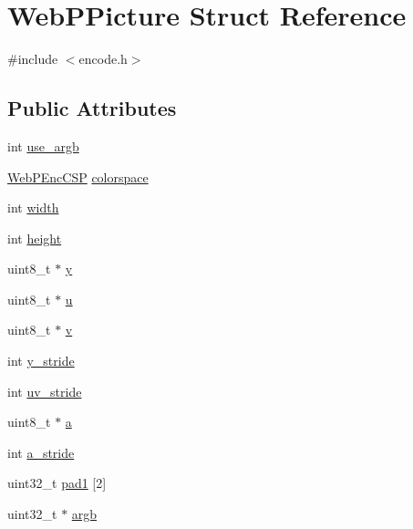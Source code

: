 \hypertarget{struct_web_p_picture}{}\section{Web\+P\+Picture Struct Reference}
\label{struct_web_p_picture}


{\ttfamily \#include $<$encode.\+h$>$}

\subsection*{Public Attributes}
\begin{DoxyCompactItemize}
\item 
int \mbox{\hyperlink{struct_web_p_picture_a80d9adec5005d52025ac7e4407bd464e}{use\+\_\+argb}}
\item 
\mbox{\hyperlink{encode_8h_a40e7d92ce3a63e372e184efbcd62c925}{Web\+P\+Enc\+C\+SP}} \mbox{\hyperlink{struct_web_p_picture_a3da62a6144bda9f8a25c851cc3c5b8c9}{colorspace}}
\item 
int \mbox{\hyperlink{struct_web_p_picture_a100898a4048f95fc6c91558aceaa99df}{width}}
\item 
int \mbox{\hyperlink{struct_web_p_picture_a033bd88269b0bde323e3cc24b24854e0}{height}}
\item 
uint8\+\_\+t $\ast$ \mbox{\hyperlink{struct_web_p_picture_a2a7d500f47757cd483db60ac35d8a041}{y}}
\item 
uint8\+\_\+t $\ast$ \mbox{\hyperlink{struct_web_p_picture_a073da8cb988f1a32d1859d708561d181}{u}}
\item 
uint8\+\_\+t $\ast$ \mbox{\hyperlink{struct_web_p_picture_a7b502a9b9b14185a490a05deefda438a}{v}}
\item 
int \mbox{\hyperlink{struct_web_p_picture_ae8e016b9af5d8155b16005904f6f5881}{y\+\_\+stride}}
\item 
int \mbox{\hyperlink{struct_web_p_picture_a302e79b710cff94b46432066d267db21}{uv\+\_\+stride}}
\item 
uint8\+\_\+t $\ast$ \mbox{\hyperlink{struct_web_p_picture_a9ba92e4968230d840da0acbf48f6f2fb}{a}}
\item 
int \mbox{\hyperlink{struct_web_p_picture_a02c5a78d2e29327439d258a47afd036a}{a\+\_\+stride}}
\item 
uint32\+\_\+t \mbox{\hyperlink{struct_web_p_picture_a4bf90baa1a76c06e7e96f9fdcd42e357}{pad1}} \mbox{[}2\mbox{]}
\item 
uint32\+\_\+t $\ast$ \mbox{\hyperlink{struct_web_p_picture_a69213b56a4eb3894d9b3bdeabce7c956}{argb}}

\end{DoxyCompactItemize}
